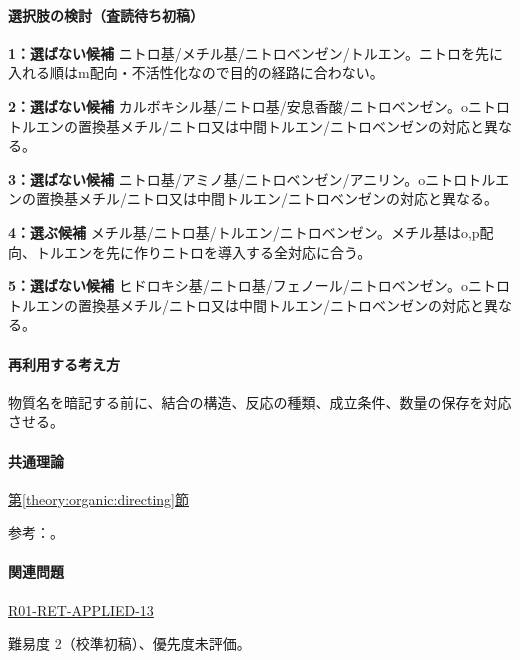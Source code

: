 \paragraph{選択肢の検討（査読待ち初稿）}\mbox{}\par

\noindent\textbf{1：選ばない候補} ニトロ基/メチル基/ニトロベンゼン/トルエン。ニトロを先に入れる順はm配向・不活性化なので目的の経路に合わない。\par

\noindent\textbf{2：選ばない候補} カルボキシル基/ニトロ基/安息香酸/ニトロベンゼン。oニトロトルエンの置換基メチル/ニトロ又は中間トルエン/ニトロベンゼンの対応と異なる。\par

\noindent\textbf{3：選ばない候補} ニトロ基/アミノ基/ニトロベンゼン/アニリン。oニトロトルエンの置換基メチル/ニトロ又は中間トルエン/ニトロベンゼンの対応と異なる。\par

\noindent\textbf{4：選ぶ候補} メチル基/ニトロ基/トルエン/ニトロベンゼン。メチル基はo,p配向、トルエンを先に作りニトロを導入する全対応に合う。\par

\noindent\textbf{5：選ばない候補} ヒドロキシ基/ニトロ基/フェノール/ニトロベンゼン。oニトロトルエンの置換基メチル/ニトロ又は中間トルエン/ニトロベンゼンの対応と異なる。\par

\paragraph{再利用する考え方} 物質名を暗記する前に、結合の構造、反応の種類、成立条件、数量の保存を対応させる。

\paragraph{共通理論} \hyperref[theory:organic:directing]{第\ref*{theory:organic:directing}節}

\par 参考：\cite{organic_directing}。

\paragraph{関連問題} \hyperref[q:r01-ret-applied-13]{R01-RET-APPLIED-13}

\par 難易度 2（校準初稿）、優先度未評価。

